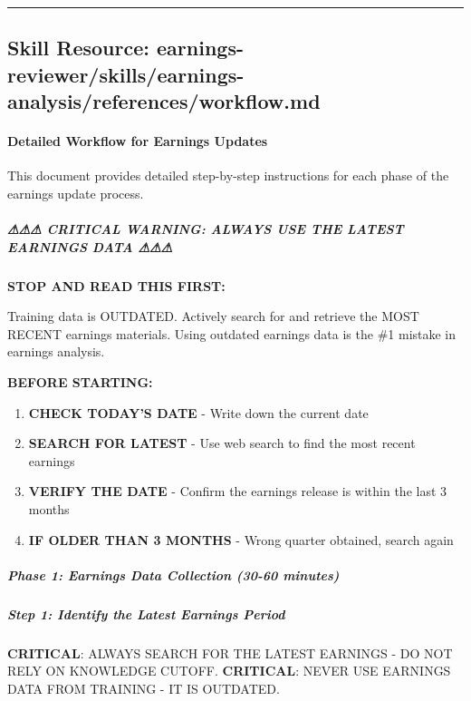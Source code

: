 \documentclass[11pt]{article}
\begin{document}
\vspace{0.8em}\hrule\vspace{0.8em}

\subsection{Skill Resource: earnings-reviewer/skills/earnings-analysis/references/workflow.md}\label{file:earnings-reviewer-skills-earnings-analysis-references-workflow-md}

\paragraph{Detailed Workflow for Earnings Updates}\mbox{}\par

This document provides detailed step-by-step instructions for each phase of the earnings update process.


\subparagraph{⚠⚠⚠ CRITICAL WARNING: ALWAYS USE THE LATEST EARNINGS DATA ⚠⚠⚠}\mbox{}\par

\textbf{STOP AND READ THIS FIRST:}


Training data is OUTDATED. Actively search for and retrieve the MOST RECENT earnings materials. Using outdated earnings data is the \#1 mistake in earnings analysis.


\textbf{BEFORE STARTING:}

\begin{enumerate}[leftmargin=*,itemsep=2pt,topsep=2pt]
\item {} \textbf{CHECK TODAY'S DATE} - Write down the current date
\item {} \textbf{SEARCH FOR LATEST} - Use web search to find the most recent earnings
\item {} \textbf{VERIFY THE DATE} - Confirm the earnings release is within the last 3 months
\item {} \textbf{IF OLDER THAN 3 MONTHS} - Wrong quarter obtained, search again
\end{enumerate}

\subparagraph{Phase 1: Earnings Data Collection (30-60 minutes)}\mbox{}\par

\subparagraph{Step 1: Identify the Latest Earnings Period}\mbox{}\par

\textbf{CRITICAL}: ALWAYS SEARCH FOR THE LATEST EARNINGS - DO NOT RELY ON KNOWLEDGE CUTOFF. \textbf{CRITICAL}: NEVER USE EARNINGS DATA FROM TRAINING - IT IS OUTDATED.
\end{document}
